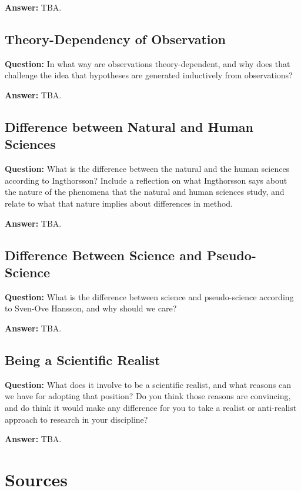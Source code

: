 \documentclass[11pt]{scrartcl}
\begin{document}
\bigbreak

\textbf{Answer:} TBA.

\subsection{Theory-Dependency of Observation}

\textbf{Question:} In what way are observations theory-dependent, and why does that challenge the idea that hypotheses are generated inductively from observations?

\bigbreak

\textbf{Answer:} TBA.

\subsection{Difference between Natural and Human Sciences}

\textbf{Question:} What is the difference between the natural and the human sciences according to Ingthorsson? Include a reflection on what Ingthorsson says about the nature of the phenomena that the natural and human sciences study, and relate to what that nature implies about differences in method.

\bigbreak

\textbf{Answer:} TBA.

\subsection{Difference Between Science and Pseudo-Science}

\textbf{Question:} What is the difference between science and pseudo-science according to Sven-Ove Hansson, and why should we care?

\bigbreak

\textbf{Answer:} TBA.

\subsection{Being a Scientific Realist}

\textbf{Question:} What does it involve to be a scientific realist, and what reasons can we have for adopting that position? Do you think those reasons are convincing, and do think it would make any difference for you to take a realist or anti-realist approach to research in your discipline?

\bigbreak

\textbf{Answer:} TBA.

\section{Sources}
\end{document}
